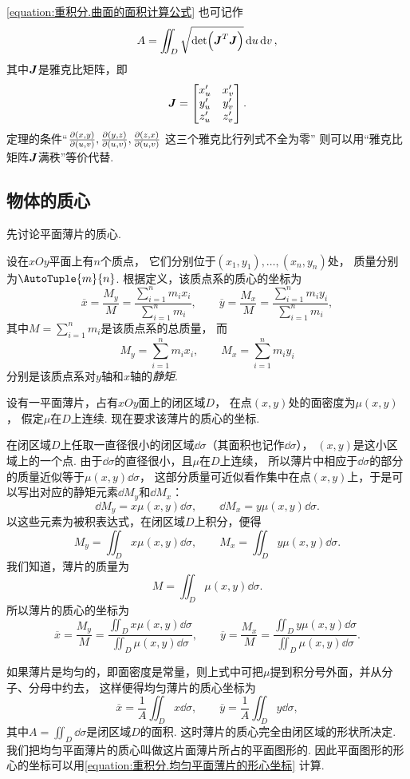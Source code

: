 \cref{equation:重积分.曲面的面积计算公式} 也可记作\[
	A = \iint_D \sqrt{\det(\boldsymbol{J}^T \boldsymbol{J})} \dd{u}\dd{v},
\]
其中\(\boldsymbol{J}\)是雅克比矩阵，即\[
	\boldsymbol{J} = \begin{bmatrix}
		x'_u & x'_v \\
		y'_u & y'_v \\
		z'_u & z'_v
	\end{bmatrix}.
\]
定理的条件“\(\pdv{ (x,y) }{ (u,v) },
\pdv{ (y,z) }{ (u,v) },
\pdv{ (z,x) }{ (u,v) }\)
这三个雅克比行列式不全为零”
则可以用“雅克比矩阵\(\boldsymbol{J}\)满秩”等价代替.

\subsection{物体的质心}
先讨论平面薄片的质心.

设在\(xOy\)平面上有\(n\)个质点，
它们分别位于\((x_1,y_1),\dotsc,(x_n,y_n)\)处，
质量分别为\(\AutoTuple{m}{n}\).
根据定义，该质点系的质心的坐标为\[
	\overline{x} = \frac{M_y}{M}
	= \frac{\sum_{i=1}^n m_i x_i}{\sum_{i=1}^n m_i},
	\qquad
	\overline{y} = \frac{M_x}{M}
	= \frac{\sum_{i=1}^n m_i y_i}{\sum_{i=1}^n m_i},
\]
其中\(M = \sum_{i=1}^n m_i\)是该质点系的总质量，
而\[
	M_y = \sum_{i=1}^n m_i x_i,
	\qquad
	M_x = \sum_{i=1}^n m_i y_i
\]分别是该质点系对\(y\)轴和\(x\)轴的\emph{静矩}.

设有一平面薄片，占有\(xOy\)面上的闭区域\(D\)，
在点\((x,y)\)处的面密度为\(\mu(x,y)\)，
假定\(\mu\)在\(D\)上连续.
现在要求该薄片的质心的坐标.

在闭区域\(D\)上任取一直径很小的闭区域\(\dd\sigma\)（其面积也记作\(\dd\sigma\)），
\((x,y)\)是这小区域上的一个点.
由于\(\dd\sigma\)的直径很小，且\(\mu\)在\(D\)上连续，
所以薄片中相应于\(\dd\sigma\)的部分的质量近似等于\(\mu(x,y) \dd\sigma\)，
这部分质量可近似看作集中在点\((x,y)\)上，于是可以写出对应的静矩元素\(\dd{M_y}\)和\(\dd{M_x}\)：\[
	\dd{M_y} = x \mu(x,y) \dd\sigma,
	\qquad
	\dd{M_x} = y \mu(x,y) \dd\sigma.
\]
以这些元素为被积表达式，在闭区域\(D\)上积分，便得\[
	M_y = \iint_D x \mu(x,y) \dd\sigma,
	\qquad
	M_x = \iint_D y \mu(x,y) \dd\sigma.
\]
我们知道，薄片的质量为\[
	M = \iint_D \mu(x,y) \dd\sigma.
\]
所以薄片的质心的坐标为\[
	\overline{x} = \frac{M_y}{M}
	= \frac{\iint_D x \mu(x,y) \dd\sigma}{\iint_D \mu(x,y) \dd\sigma},
	\qquad
	\overline{y} = \frac{M_x}{M}
	= \frac{\iint_D y \mu(x,y) \dd\sigma}{\iint_D \mu(x,y) \dd\sigma}.
\]

如果薄片是均匀的，即面密度是常量，则上式中可把\(\mu\)提到积分号外面，并从分子、分母中约去，
这样便得均匀薄片的质心坐标为\begin{equation}\label{equation:重积分.均匀平面薄片的形心坐标}
	\overline{x} = \frac1A \iint_D x \dd\sigma,
	\qquad
	\overline{y} = \frac1A \iint_D y \dd\sigma,
\end{equation}
其中\(A = \iint_D \dd\sigma\)是闭区域\(D\)的面积.
这时薄片的质心完全由闭区域的形状所决定.
我们把均匀平面薄片的质心叫做这片面薄片所占的平面图形的.
因此平面图形的形心的坐标可以用\cref{equation:重积分.均匀平面薄片的形心坐标} 计算.

